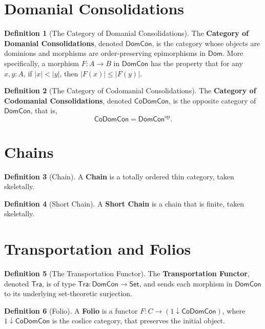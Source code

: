 \documentclass[11pt]{article}
\theoremstyle{definition}
\newtheorem{definition}{Definition}[section]
\theoremstyle{plain}
\newcommand{\Set}{\mathsf{Set}}
\begin{document}
\section{Domanial Consolidations}

\begin{definition}[The Category of Domanial Consolidations]
The \textbf{Category of Domanial Consolidations}, denoted $\mathsf{DomCon}$,
is the category whose objects are dominions and morphisms are order-preserving
epimorphisms in $\mathsf{Dom}$. More specifically, a morphism
$F : A \to B$ in $\mathsf{DomCon}$ has the property that for any $x,y : A$,
if $\lvert x\rvert < \lvert y\rvert$, then
$\lvert F(x)\rvert \leq \lvert F(y)\rvert$.
\end{definition}

\begin{definition}[The Category of Codomanial Consolidations]
The \textbf{Category of Codomanial Consolidations}, denoted
$\mathsf{CoDomCon}$, is the opposite category of $\mathsf{DomCon}$, that is,
\[
  \mathsf{CoDomCon} = \mathsf{DomCon}^{\mathrm{op}}.
\]
\end{definition}

\section{Chains}

\begin{definition}[Chain]
A \textbf{Chain} is a totally ordered thin category, taken skeletally.
\end{definition}

\begin{definition}[Short Chain]
A \textbf{Short Chain} is a chain that is finite, taken skeletally.
\end{definition}

\section{Transportation and Folios}

\begin{definition}[The Transportation Functor]
The \textbf{Transportation Functor}, denoted $\mathsf{Tra}$, is of type
$\mathsf{Tra} : \mathsf{DomCon} \to \Set$, and sends each morphism in
$\mathsf{DomCon}$ to its underlying set-theoretic surjection.
\end{definition}

\begin{definition}[Folio]
A \textbf{Folio} is a functor
$F : C \to (1 \downarrow \mathsf{CoDomCon})$, where
$1 \downarrow \mathsf{CoDomCon}$ is the coslice category, that preserves the
initial object.
\end{definition}
\end{document}

